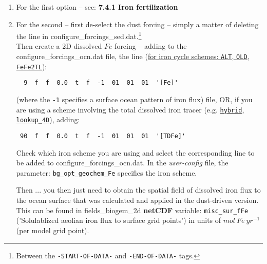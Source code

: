 \begin{enumerate}[noitemsep]
\vspace{1mm}
\item For the first option -- see: \textbf{7.4.1 Iron fertilization}
\vspace{1mm}
\item For the second -- first de-select the dust forcing -- simply a matter of  deleting the line in \textsf{\footnotesize configure\_forcings\_sed.dat}.\footnote{Between the \texttt{-START-OF-DATA-} and \texttt{-END-OF-DATA-} tags.}
\\ Then create a 2D dissolved \(Fe\) forcing -- adding to the \textsf{\footnotesize configure\_forcings\_ocn.dat} file, the line (\uline{for iron cycle schemes: \texttt{ALT}, \texttt{OLD}, \texttt{FeFe2TL}}): 
\vspace{-1mm}\begin{verbatim}
  9  f  f  0.0  t  f  -1  01  01  01  '[Fe]'
\end{verbatim}\vspace{-1mm}
\noindent (where the \texttt{-1} specifies a surface ocean pattern of iron flux) file, OR, if you are using a scheme involving the total dissolved iron tracer (e.g. \uline{\texttt{hybrid}, \texttt{lookup\_4D}}), adding:
\vspace{-1mm}\begin{verbatim}
 90  f  f  0.0  t  f  -1  01  01  01  '[TDFe]'
\end{verbatim}\vspace{-1mm}
Check which iron scheme you are using and select the corresponding line to be added to \textsf{\footnotesize configure\_forcings\_ocn.dat}. In the \textit{user-config} file, the parameter: \texttt{bg\_opt\_geochem\_Fe} specifies the iron scheme.

Then ... you then just need to obtain the spatial field of dissolved iron flux to the ocean surface that was calculated and applied in the dust-driven version. This can be found in \textsf{\footnotesize fields\_biogem\_2d} \textbf{netCDF} variable: \texttt{misc\_sur\_fFe} ('Solulablized aeolian iron flux to surface grid points') in units of \(mol \:Fe \:yr^{-1}\) (per model grid point). 


\end{enumerate}
